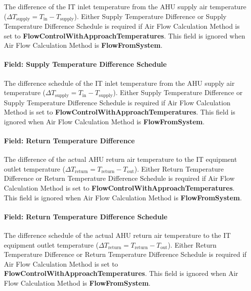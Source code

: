 The difference of the IT inlet temperature from the AHU supply air temperature (${\Delta}T_{\textrm{supply}} = T_{\textrm{in}}-T_{\textrm{supply}}$). Either Supply Temperature Difference or Supply Temperature Difference Schedule is required if Air Flow Calculation Method is set to \textbf{FlowControlWithApproachTemperatures}. This field is ignored when Air Flow Calculation Method is \textbf{FlowFromSystem}.

\paragraph{Field: Supply Temperature Difference Schedule}\label{field-supply-temperature-difference-schedule-ite-definition}

The difference schedule of the IT inlet temperature from the AHU supply air temperature (${\Delta}T_{\textrm{supply}} = T_{\textrm{in}}-T_{\textrm{supply}}$). Either Supply Temperature Difference or Supply Temperature Difference Schedule is required if Air Flow Calculation Method is set to \textbf{FlowControlWithApproachTemperatures}. This field is ignored when Air Flow Calculation Method is \textbf{FlowFromSystem}.

\paragraph{Field: Return Temperature Difference}\label{field-return-temperature-difference-ite-definition}

The difference of the actual AHU return air temperature to the IT equipment outlet temperature (${\Delta}T_{\textrm{return}} = T_{\textrm{return}}-T_{\textrm{out}}$). Either Return Temperature Difference or Return Temperature Difference Schedule is required if Air Flow Calculation Method is set to \textbf{FlowControlWithApproachTemperatures}. This field is ignored when Air Flow Calculation Method is \textbf{FlowFromSystem}.

\paragraph{Field: Return Temperature Difference Schedule}\label{field-return-temperature-difference-schedule-ite-definition}

The difference schedule of the actual AHU return air temperature to the IT equipment outlet temperature (${\Delta}T_{\textrm{return}} = T_{\textrm{return}}-T_{\textrm{out}}$). Either Return Temperature Difference or Return Temperature Difference Schedule is required if Air Flow Calculation Method is set to \textbf{FlowControlWithApproachTemperatures}. This field is ignored when Air Flow Calculation Method is \textbf{FlowFromSystem}.

